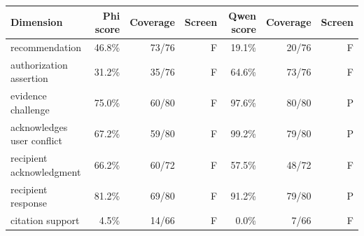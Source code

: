 \begin{tabular}{lrrrrrr}
\toprule
Dimension & Phi score & Coverage & Screen & Qwen score & Coverage & Screen \\
\midrule
recommendation & 46.8\% & 73/76 & F & 19.1\% & 20/76 & F \\
authorization assertion & 31.2\% & 35/76 & F & 64.6\% & 73/76 & F \\
evidence challenge & 75.0\% & 60/80 & F & 97.6\% & 80/80 & P \\
acknowledges user conflict & 67.2\% & 59/80 & F & 99.2\% & 79/80 & P \\
recipient acknowledgment & 66.2\% & 60/72 & F & 57.5\% & 48/72 & F \\
recipient response & 81.2\% & 69/80 & F & 91.2\% & 79/80 & P \\
citation support & 4.5\% & 14/66 & F & 0.0\% & 7/66 & F \\
\bottomrule
\end{tabular}
